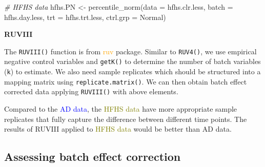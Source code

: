 \documentclass[
]{book}
\newenvironment{Shaded}{\begin{snugshade}}{\end{snugshade}}
\newcommand{\AttributeTok}[1]{\textcolor[rgb]{0.77,0.63,0.00}{#1}}
\newcommand{\CommentTok}[1]{\textcolor[rgb]{0.56,0.35,0.01}{\textit{#1}}}
\newcommand{\FunctionTok}[1]{\textcolor[rgb]{0.00,0.00,0.00}{#1}}
\newcommand{\NormalTok}[1]{#1}
\newcommand{\OtherTok}[1]{\textcolor[rgb]{0.56,0.35,0.01}{#1}}
\newcommand{\SpecialCharTok}[1]{\textcolor[rgb]{0.00,0.00,0.00}{#1}}
\newcommand{\StringTok}[1]{\textcolor[rgb]{0.31,0.60,0.02}{#1}}
\begin{document}
\begin{Shaded}
\begin{Highlighting}[]
\CommentTok{\# HFHS data}
\NormalTok{hfhs.PN }\OtherTok{\textless{}{-}} \FunctionTok{percentile\_norm}\NormalTok{(}\AttributeTok{data =}\NormalTok{ hfhs.clr.less, }
                           \AttributeTok{batch =}\NormalTok{ hfhs.day.less, }
                           \AttributeTok{trt =}\NormalTok{ hfhs.trt.less, }
                           \AttributeTok{ctrl.grp =} \StringTok{\textquotesingle{}Normal\textquotesingle{}}\NormalTok{)}
\end{Highlighting}
\end{Shaded}

\textbf{RUVIII}

The \texttt{RUVIII()} function is from \textcolor{orange}{ruv} package. Similar to \texttt{RUV4()}, we use empirical negative control variables and \texttt{getK()} to determine the number of batch variables (\texttt{k}) to estimate. We also need sample replicates which should be structured into a mapping matrix using \texttt{replicate.matrix()}. We can then obtain batch effect corrected data applying \texttt{RUVIII()} with above elements.

\begin{Shaded}
\end{Shaded}

Compared to the \textcolor{blue}{AD data}, the \textcolor{olive}{HFHS data} have more appropriate sample replicates that fully capture the difference between different time points. The results of RUVIII applied to \textcolor{olive}{HFHS data} would be better than AD data.

\hypertarget{assessing-batch-effect-correction-2}{%
\subsection{Assessing batch effect correction}\label{assessing-batch-effect-correction-2}}
\end{document}

